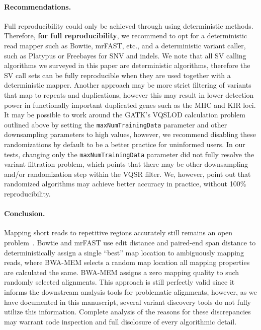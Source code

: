 \documentclass{bioinfo}
\begin{document}
\paragraph{Recommendations.}
 Full reproducibility could only be achieved through using deterministic methods. Therefore, {\bf for full reproducibility}, 
we recommend to opt for a deterministic read mapper such as Bowtie, mrFAST, etc., and a deterministic
variant caller, such as Platypus or Freebayes  for SNV and indels. We note that all SV calling algorithms we surveyed in this paper are deterministic algorithms, therefore the SV call sets can be fully reproducible when they are used together with a deterministic mapper. 
Another approach may be more strict filtering of variants that map to repeats and duplications, however this may result in lower detection power in functionally important duplicated genes such as the MHC and KIR loci.
 It may be possible to work around the GATK's VQSLOD calculation problem outlined above by setting the {\tt maxNumTrainingData} parameter and other downsampling parameters to high values, however, we recommend disabling these randomizations by default to be a better practice for uninformed users. In our tests, changing only the {\tt maxNumTrainingData} parameter did not fully resolve the variant filtration problem, which points that there may be other downsampling and/or randomization step within the VQSR filter. We, however, point out that randomized algorithms may achieve better accuracy in practice, without 100\% reproducibility.


\paragraph{Conclusion.}

Mapping short reads to repetitive regions accurately still remains an open problem~\citep{Treangen2012}. Bowtie and mrFAST use 
edit distance and paired-end span distance 
to deterministically assign a single ``best'' map location to ambiguously mapping reads, where BWA-MEM selects a random map location all mapping properties are calculated the same. BWA-MEM assigns a zero mapping quality
to such randomly selected alignments. This approach is still perfectly valid since it informs the downstream analysis tools for problematic alignments, however, as we have documented in this manuscript, 
several variant discovery tools do not fully utilize this information. Complete analysis of the reasons for these discrepancies may warrant code inspection and full disclosure of every algorithmic detail.
\end{document}
